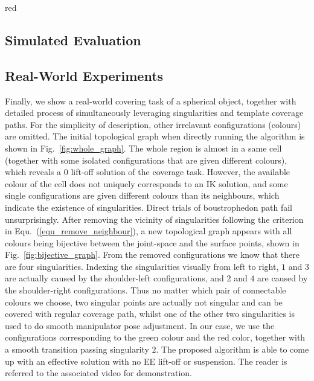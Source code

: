 \documentclass[Afour,sageh,times]{sagej}
\begin{document}
\begin{color}{red}
\subsection{Simulated Evaluation}\label{subsection_simulated}

\subsection{Real-World Experiments}\label{subsection_realworld}

Finally, we show a real-world covering task of a spherical object, together with detailed process of simultaneously leveraging singularities and template coverage paths. For the simplicity of description, other irrelavant configurations (colours) are omitted. 
The initial topological graph when directly running the algorithm is shown in Fig.~\ref{fig:whole_graph}. The whole region is almost in a same cell (together with some isolated configurations that are given different colours), which reveals a $0$ lift-off solution of the coverage task. However, the available colour of the cell does not uniquely corresponds to an IK solution, and some single configurations are given different colours than its neighbours, which indicate the existence of singularities. Direct trials of boustrophedon path fail unsurprisingly. 
After removing the vicinity of singularities following the criterion in Equ.~(\ref{equ_remove_neighbour}), a new topological graph appears with all colours being bijective between the joint-space and the surface points, shown in Fig.~\ref{fig:bijective_graph}. From the removed configurations we know that there are four singularities. Indexing the singularities visually from left to right, $1$ and $3$ are actually caused by the shoulder-left configurations, and $2$ and $4$ are caused by the shoulder-right configurations. Thus no matter which pair of connectable colours we choose, two singular points are actually not singular and can be covered with regular coverage path, whilst one of the other two singularities is used to do smooth manipulator pose adjustment. 
In our case, we use the configurations corresponding to the green colour and the red color, together with a smooth transition passing singularity $2$. The proposed algorithm is able to come up with an effective solution with no EE lift-off or suspension. The reader is referred to the associated video for demonstration. 



\end{color}
\end{document}
